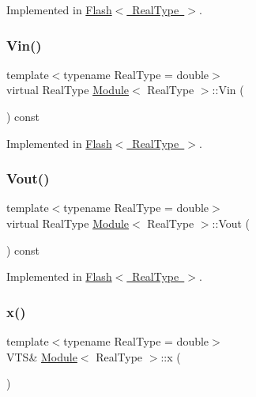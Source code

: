 Implemented in \mbox{\hyperlink{class_flash_a1c6d0596f0a6dbdd7b391ab85772b2d4}{Flash$<$ Real\+Type $>$}}.

\mbox{\label{class_module_a5ef6a7e21c2941a3e8940e7c0e5f0670}} 
\subsubsection{\texorpdfstring{Vin()}{Vin()}}
{\footnotesize\ttfamily template$<$typename Real\+Type  = double$>$ \\
virtual Real\+Type \mbox{\hyperlink{class_module}{Module}}$<$ Real\+Type $>$\+::Vin (\begin{DoxyParamCaption}{ }\end{DoxyParamCaption}) const\hspace{0.3cm}{\ttfamily [pure virtual]}}



Implemented in \mbox{\hyperlink{class_flash_a6b1604cf88d584aeea83f00bc7587dda}{Flash$<$ Real\+Type $>$}}.

\mbox{\label{class_module_ae479ac97ae43fd740cdd44b947b952d9}} 
\subsubsection{\texorpdfstring{Vout()}{Vout()}}
{\footnotesize\ttfamily template$<$typename Real\+Type  = double$>$ \\
virtual Real\+Type \mbox{\hyperlink{class_module}{Module}}$<$ Real\+Type $>$\+::Vout (\begin{DoxyParamCaption}{ }\end{DoxyParamCaption}) const\hspace{0.3cm}{\ttfamily [pure virtual]}}



Implemented in \mbox{\hyperlink{class_flash_aadd1e6c91da7d8a56b69f815b4346c5b}{Flash$<$ Real\+Type $>$}}.

\mbox{\label{class_module_acf76d87028eea43147dce5812a0ed508}} 
\subsubsection{\texorpdfstring{x()}{x()}\hspace{0.1cm}{\footnotesize\ttfamily [1/2]}}
{\footnotesize\ttfamily template$<$typename Real\+Type  = double$>$ \\
V\+TS\& \mbox{\hyperlink{class_module}{Module}}$<$ Real\+Type $>$\+::x (\begin{DoxyParamCaption}{ }\end{DoxyParamCaption})\hspace{0.3cm}{\ttfamily [inline]}}

